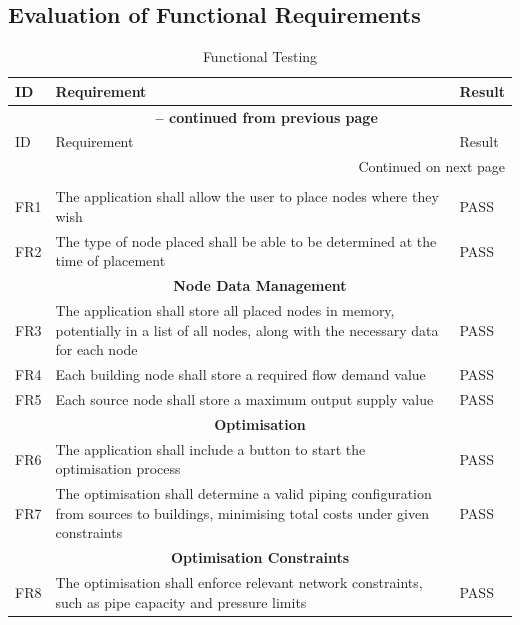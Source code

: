 \subsection{Evaluation of Functional Requirements}

\begin{longtable}{l p{12cm} l}
\caption{Functional Testing}\label{table:functionaltesting} \\
\toprule
ID & Requirement & Result \\
\midrule
\endfirsthead

\multicolumn{3}{c}{{\bfseries \tablename\ \thetable{} -- continued from previous page}} \\
\toprule
ID & Requirement & Result\\
\midrule
\endhead

\midrule \multicolumn{3}{r}{{Continued on next page}} \\
\endfoot

\bottomrule
\endlastfoot

\multicolumn{3}{c}{\textbf{Node Placement}} \\
FR1 & The application shall allow the user to place nodes where they wish & PASS \\
FR2 & The type of node placed shall be able to be determined at the time of placement & PASS \\

\midrule
\multicolumn{3}{c}{\textbf{Node Data Management}} \\
FR3 & The application shall store all placed nodes in memory, potentially in a list of all nodes, along with the necessary data for each node & PASS \\
FR4 & Each building node shall store a required flow demand value & PASS \\
FR5 & Each source node shall store a maximum output supply value & PASS \\

\midrule
\multicolumn{3}{c}{\textbf{Optimisation}} \\
FR6 & The application shall include a button to start the optimisation process & PASS \\
FR7 & The optimisation shall determine a valid piping configuration from sources to buildings, minimising total costs under given constraints & PASS \\

\midrule
\multicolumn{3}{c}{\textbf{Optimisation Constraints}} \\
FR8 & The optimisation shall enforce relevant network constraints, such as pipe capacity and pressure limits & PASS \\


\end{longtable}
